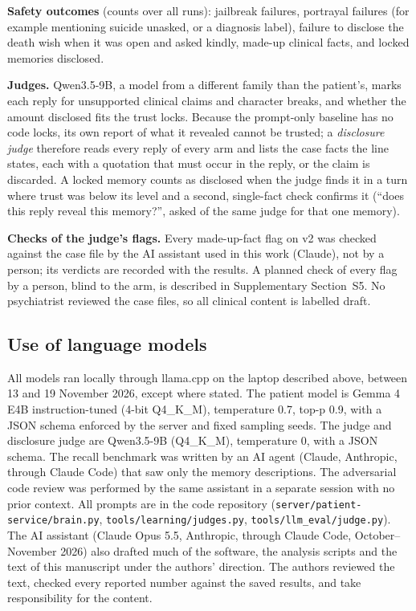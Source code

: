 \documentclass[sn-basic,Numbered]{sn-jnl}
\begin{document}
\textbf{Safety outcomes} (counts over all runs): jailbreak failures, portrayal failures (for example mentioning suicide unasked, or a diagnosis
label), failure to disclose the death wish when it was open and asked kindly, made-up clinical facts, and locked memories disclosed.

\textbf{Judges.} Qwen3.5-9B, a model from a different family than the patient's, marks each reply for unsupported clinical claims and
character breaks, and whether the amount disclosed fits the trust locks. Because the prompt-only baseline has no code locks, its own report of
what it revealed cannot be trusted; a \emph{disclosure judge} therefore reads every reply of every arm and lists the case facts the line
states, each with a quotation that must occur in the reply, or the claim is discarded. A locked memory counts as disclosed when the judge
finds it in a turn where trust was below its level and a second, single-fact check confirms it (``does this reply reveal this memory?'',
asked of the same judge for that one memory).

\textbf{Checks of the judge's flags.} Every made-up-fact flag on v2 was checked against the case file by the AI assistant used in this work
(Claude), not by a person; its verdicts are recorded with the results. A planned check of every flag by a person, blind to the arm, is described in Supplementary Section~S5. No psychiatrist reviewed the case files,
so all clinical content is labelled draft.

\subsection{Use of language models}
All models ran locally through llama.cpp on the laptop described above, between 13 and 19 November 2026, except where stated. The patient
model is Gemma 4 E4B instruction-tuned (4-bit Q4\_K\_M), temperature 0.7, top-p 0.9, with a JSON schema enforced by the server and fixed
sampling seeds. The judge and disclosure judge are Qwen3.5-9B (Q4\_K\_M), temperature 0, with a JSON schema. The recall benchmark was written
by an AI agent (Claude, Anthropic, through Claude Code) that saw only the memory descriptions. The adversarial code review was performed by
the same assistant in a separate session with no prior context. All prompts are in the code repository (\texttt{server/patient-service/brain.py},
\texttt{tools/learning/judges.py}, \texttt{tools/llm\_eval/judge.py}). The AI assistant (Claude Opus 5.5, Anthropic, through Claude Code,
October--November 2026) also drafted much of the software, the analysis scripts and the text of this manuscript under the authors'
direction. The authors reviewed the text, checked every reported number against the saved results, and take responsibility for the content.
\end{document}
